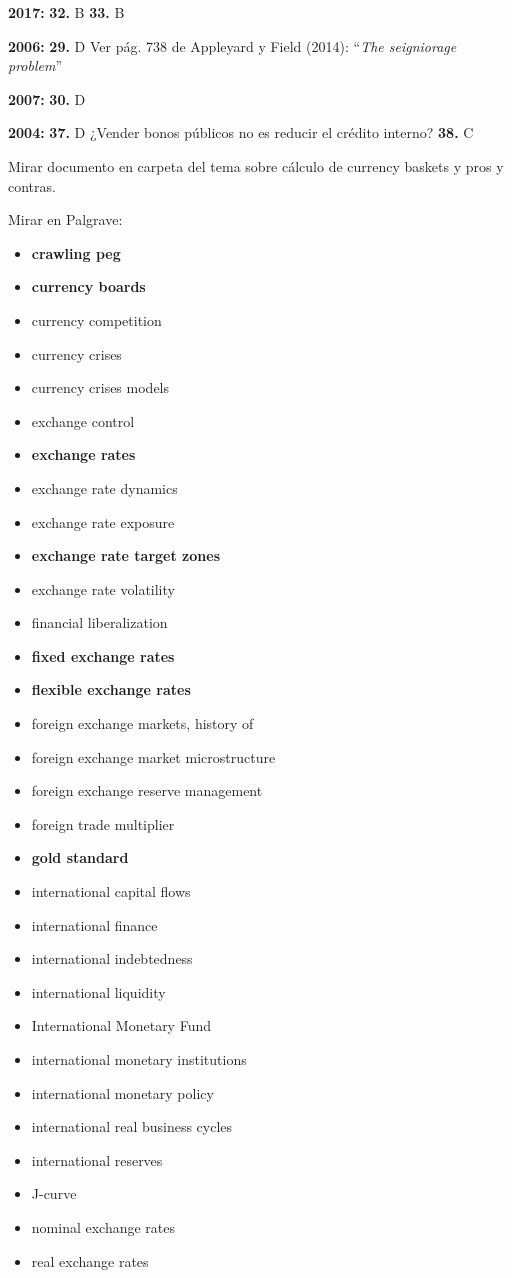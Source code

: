 \documentclass{nuevotema}
\begin{document}
\notas

\textbf{2017:} \textbf{32.} B \textbf{33.} B

\textbf{2006:} \textbf{29.} D Ver pág. 738 de Appleyard y Field (2014): ``\textit{The seigniorage problem}''

\textbf{2007:} \textbf{30.} D

\textbf{2004:} \textbf{37.} D ¿Vender bonos públicos no es reducir el crédito interno? \textbf{38.} C 

Mirar documento en carpeta del tema sobre cálculo de currency baskets y pros y contras.

\bibliografia

Mirar en Palgrave:
\begin{itemize}
	\item \textbf{crawling peg}
	\item \textbf{currency boards}
	\item currency competition
	\item currency crises
	\item currency crises models
	\item exchange control
	\item \textbf{exchange rates}
	\item exchange rate dynamics
	\item exchange rate exposure
	\item \textbf{exchange rate target zones}
	\item exchange rate volatility
	\item financial liberalization
	\item \textbf{fixed exchange rates}
	\item \textbf{flexible exchange rates}
	\item foreign exchange markets, history of
	\item foreign exchange market microstructure
	\item foreign exchange reserve management
	\item foreign trade multiplier
	\item \textbf{gold standard}
	\item international capital flows
	\item international finance
	\item international indebtedness
	\item international liquidity
	\item International Monetary Fund
	\item international monetary institutions
	\item international monetary policy
	\item international real business cycles
	\item international reserves
	\item J-curve
	\item nominal exchange rates
	\item real exchange rates
\end{itemize}
\end{document}
